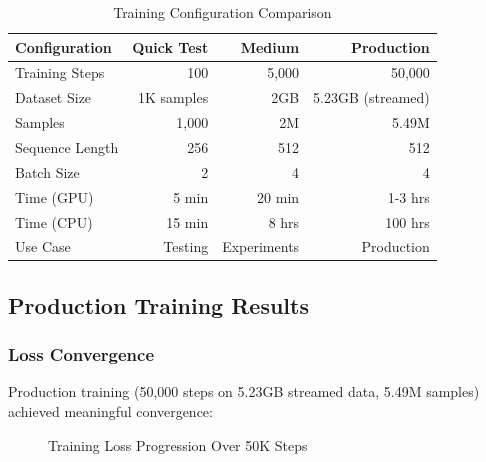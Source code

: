\documentclass[11pt,a4paper]{article}
\begin{document}
\begin{table}[H]
\centering
\begin{tabular}{lrrr}
\toprule
\textbf{Configuration} & \textbf{Quick Test} & \textbf{Medium} & \textbf{Production} \\
\midrule
Training Steps & 100 & 5,000 & 50,000 \\
Dataset Size & 1K samples & 2GB & 5.23GB (streamed) \\
Samples & 1,000 & ~2M & 5.49M \\
Sequence Length & 256 & 512 & 512 \\
Batch Size & 2 & 4 & 4 \\
Time (GPU) & ~5 min & ~20 min & 1-3 hrs \\
Time (CPU) & ~15 min & ~8 hrs & ~100 hrs \\
Use Case & Testing & Experiments & Production \\
\bottomrule
\end{tabular}
\caption{Training Configuration Comparison}
\label{tab:training-configs}
\end{table}

\subsection{Production Training Results}

\subsubsection{Loss Convergence}
Production training (50,000 steps on 5.23GB streamed data, 5.49M samples) achieved meaningful convergence:

\begin{figure}[H]
\centering
{}
\caption{Training Loss Progression Over 50K Steps}
\label{fig:loss-curve}
\end{figure}
\end{document}

